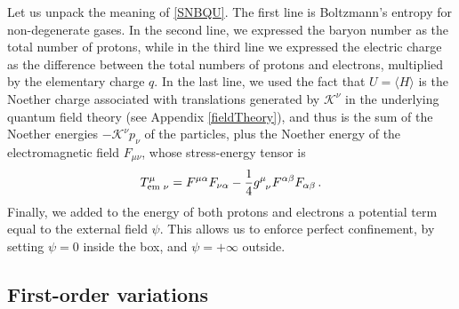 \documentclass[a4paper, amsfonts, amssymb, amsmath, reprint, showkeys, nofootinbib, twoside, onecolumn,notitlepage]{revtex4-1}
\newcommand{\K}{{\mathcal{K}}}
\theoremstyle{definition}
\theoremstyle{theorem}
\begin{document}
Let us unpack the meaning of \eqref{SNBQU}. The first line is Boltzmann's entropy for non-degenerate gases. In the second line, we expressed the baryon number as the total number of protons, while in the third line we expressed the electric charge as the difference between the total numbers of protons and electrons, multiplied by the elementary charge $q$. In the last line, we used the fact that $U=\langle H\rangle$ is the Noether charge associated with translations generated by $\K^\nu$ in the underlying quantum field theory (see Appendix \ref{fieldTheory}), and thus is the sum of the Noether energies $-\K^\nu p_\nu$ of the particles, plus the Noether energy of the electromagnetic field $F_{\mu \nu}$, whose stress-energy tensor is
\begin{equation}\label{TFF4FF}
T^{\mu }_{\text{em }\nu}=F^{\mu \alpha} F_{\nu \alpha} -\dfrac{1}{4}g\indices{^\mu _\nu} F^{\alpha \beta}F_{\alpha \beta} \, .
\end{equation}
Finally, we added to the energy of both protons and electrons a potential term equal to the external field $\psi$. This allows us to enforce perfect confinement, by setting $\psi = 0$ inside the box, and $\psi = +\infty$ outside.

\vspace{-0.3cm}
\subsection{First-order variations}
\vspace{-0.3cm}
\end{document}
